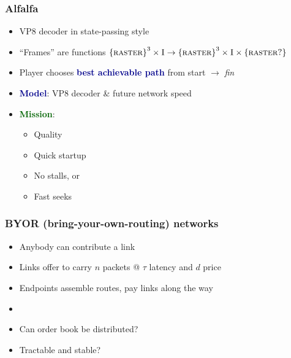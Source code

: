 \documentclass[svgnames]{beamer}
\begin{document}
\begin{frame}
\frametitle{Alfalfa}

\large

\begin{itemize}

\item VP8 decoder in state-passing style

\item ``Frames'' are functions $\textsc{\{raster\}}^3 \times \textsc{I} \rightarrow \textsc{\{raster\}}^3 \times \textsc{I} \times \textsc{\{raster?\}}$

\item Player chooses \textbf{\textcolor{DarkBlue}{best achievable path}} from start $\rightarrow$ \textit{fin}

\vspace{\baselineskip}

\item \textcolor{DarkBlue}{\bf Model}: VP8 decoder \& future network speed

\item \textcolor{DarkGreen}{\bf Mission}: 

\begin{itemize}
\item Quality
\item Quick startup
\item No stalls, or
\item Fast seeks
\end{itemize}

\end{itemize}

\end{frame}

\begin{frame}
\frametitle{BYOR (bring-your-own-routing) networks}

\large

\begin{itemize}

\item Anybody can contribute a link

\item Links offer to carry $n$ packets @ $\tau$ latency and $d$ price

\item Endpoints assemble routes, pay links along the way

\item []

\item Can order book be distributed?

\item Tractable and stable?

\end{itemize}

\end{frame}
\end{document}
